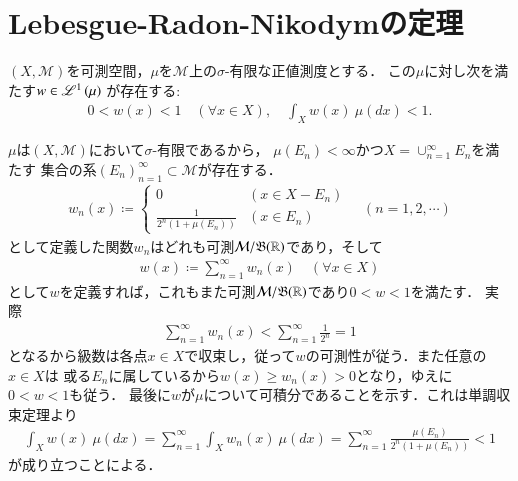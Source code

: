 \section{Lebesgue-Radon-Nikodymの定理}
	\begin{itembox}[l]{}
		\begin{lem}
			$(X,\mathcal{M})$を可測空間，$\mu$を$\mathcal{M}$上の$\sigma$-有限な正値測度とする．
			この$\mu$に対し次を満たす$w \in \mathscr{L}^{1} \left(\mu\right)$\footnotemark
			が存在する:
			\begin{align}
				0 < w(x) < 1 \quad (\forall x \in X), \quad \int_X w(x)\ \mu(dx) < 1.
			\end{align}
			\label{lem:lebesgue-radon-nikodym}
		\end{lem}
	\end{itembox}
	
	
	\begin{prf}
		$\mu$は$(X,\mathcal{M})$において$\sigma$-有限であるから，
		$\mu(E_n) < \infty$かつ$X = \cup_{n=1}^\infty E_n$を満たす
		集合の系$(E_n)_{n=1}^\infty \subset \mathcal{M}$が存在する．
		\begin{align}
			w_n(x) \coloneqq
			\begin{cases}
				0 & (x \in X - E_n) \\
				\frac{1}{2^n(1+\mu(E_n))} & (x \in E_n)
			\end{cases}
			\quad (n=1,2,\cdots)
		\end{align}
		として定義した関数$w_n$はどれも可測$\mathcal{M}/\mathfrak{B}(\mathbb{R})$であり，そして
		\begin{align}
			w(x) \coloneqq \sum_{n=1}^{\infty} w_n(x) \quad (\forall x \in X)
		\end{align}
		として$w$を定義すれば，これもまた可測$\mathcal{M}/\mathfrak{B}(\mathbb{R})$であり$0 < w < 1$を満たす．
		実際
		\begin{align}
			\sum_{n=1}^\infty w_n(x) < \sum_{n=1}^\infty \frac{1}{2^n} = 1
		\end{align}
		となるから級数は各点$x \in X$で収束し，従って$w$の可測性が従う．また任意の$x \in X$は
		或る$E_n$に属しているから$w(x) \geq w_n(x) > 0$となり，ゆえに$0 < w < 1$も従う．
		最後に$w$が$\mu$について可積分であることを示す．これは単調収束定理より
		\begin{align}
			\int_X w(x)\ \mu(dx) = \sum_{n=1}^{\infty} \int_X w_n(x)\ \mu(dx) = \sum_{n=1}^{\infty} \frac{\mu(E_n)}{2^n(1+\mu(E_n))} < 1
		\end{align}
		が成り立つことによる．
		\QED
	\end{prf}
	

